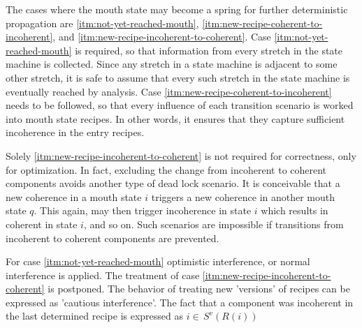 \documentclass[12pt,a4paper]{scrartcl}
\begin{document}
The cases where the mouth state may become a spring for further deterministic
propagation are \ref{itm:not-yet-reached-mouth},
\ref{itm:new-recipe-coherent-to-incoherent}, and
\ref{itm:new-recipe-incoherent-to-coherent}. Case
\ref{itm:not-yet-reached-mouth} is required, so that information from every
stretch in the state machine is collected.  Since any stretch in a state
machine is adjacent to some other stretch, it is safe to assume that every such
stretch in the state machine is eventually reached by analysis. Case
\ref{itm:new-recipe-coherent-to-incoherent} needs to be followed, so that every
influence of each transition scenario is worked into mouth state recipes. In
other words, it ensures that they capture sufficient incoherence in the entry
recipes. 

Solely \ref{itm:new-recipe-incoherent-to-coherent} is not required for
correctness, only for optimization. In fact, excluding the change from
incoherent to coherent components avoids another type of dead lock scenario.
It is conceivable that a new coherence in a mouth state $i$ triggers a new
coherence in another mouth state $q$. This again, may then trigger incoherence
in state $i$ which results in coherent in state $i$, and so on. Such scenarios
are impossible if transitions from incoherent to coherent components are
prevented.

For case \ref{itm:not-yet-reached-mouth} optimistic interference, or normal
interference is applied. The treatment of case
\ref{itm:new-recipe-incoherent-to-coherent} is postponed. The behavior of treating
new 'versions' of recipes can be expressed as 'cautious interference'. The fact
that a component was incoherent in the last determined recipe is expressed
as $i\in\,S^v(R(i))$
\end{document}
